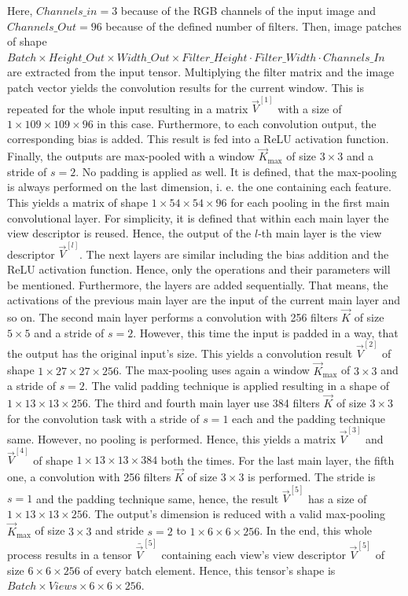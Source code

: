 Here, $Channels\_in = 3$ because of the RGB channels of the input image and $Channels\_Out = 96$ because of the defined number of filters.
Then, image patches of shape $Batch \times Height\_Out \times Width\_Out \times Filter\_Height \cdot Filter\_Width \cdot Channels\_In$ are extracted from the input tensor.
Multiplying the filter matrix and the image patch vector yields the convolution results for the current window.
This is repeated for the whole input resulting in a matrix $\vec{V}^{[1]}$ with a size of $1 \times 109 \times 109 \times 96$ in this case.
Furthermore, to each convolution output, the corresponding bias is added.
This result is fed into a ReLU activation function.
Finally, the outputs are max-pooled with a window $\vec{K}_{\text{max}}$ of size $3 \times 3$ and a stride of $s=2$.
No padding is applied as well.
It is defined, that the max-pooling is always performed on the last dimension, i. e. the one containing each feature.
This yields a matrix of shape $1 \times 54 \times 54 \times 96$ for each pooling in the first main convolutional layer.
For simplicity, it is defined that within each main layer the view descriptor is reused.
Hence, the output of the $l$-th main layer is the view descriptor $\vec{V}^{[l]}$.
The next layers are similar including the bias addition and the ReLU activation function.
Hence, only the operations and their parameters will be mentioned.
Furthermore, the layers are added sequentially.
That means, the activations of the previous main layer are the input of the current main layer and so on.
The second main layer performs a convolution with 256 filters $\vec{K}$ of size $5 \times 5$ and a stride of $s=2$.
However, this time the input is padded in a way, that the output has the original input's size.
This yields a convolution result $\vec{V}^{[2]}$ of shape $1 \times 27 \times 27 \times 256$.
The max-pooling uses again a window $\vec{K}_{\text{max}}$ of $3 \times 3$ and a stride of $s=2$.
The valid padding technique is applied resulting in a shape of $1 \times 13 \times 13 \times 256$.
The third and fourth main layer use 384 filters $\vec{K}$ of size $3 \times 3$ for the convolution task with a stride of $s=1$ each and the padding technique same.
However, no pooling is performed.
Hence, this yields a matrix $\vec{V}^{[3]}$ and $\vec{V}^{[4]}$ of shape $1 \times 13 \times 13 \times 384$ both the times.
For the last main layer, the fifth one, a convolution with 256 filters $\vec{K}$ of size $3 \times 3$ is performed.
The stride is $s=1$ and the padding technique same, hence, the result $\vec{V}^{[5]}$ has a size of $1 \times 13 \times 13 \times 256$.
The output's dimension is reduced with a valid max-pooling $\vec{K}_{\text{max}}$ of size $3 \times 3$ and stride $s=2$ to $1 \times 6 \times 6 \times 256$.
In the end, this whole process results in a tensor $\bar{\vec{V}}^{[5]}$ containing each view's view descriptor $\vec{V}^{[5]}$ of size $6 \times 6 \times 256$ of every batch element.
Hence, this tensor's shape is $Batch \times Views \times 6 \times 6 \times 256$.